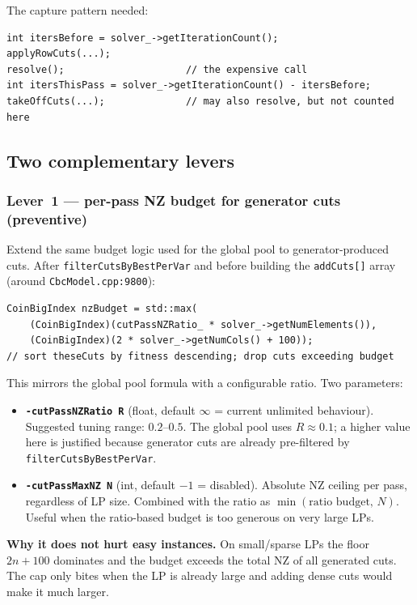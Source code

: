 \documentclass[11pt,a4paper]{article}
\begin{document}
The capture pattern needed:
\begin{lstlisting}
int itersBefore = solver_->getIterationCount();
applyRowCuts(...);
resolve();                     // the expensive call
int itersThisPass = solver_->getIterationCount() - itersBefore;
takeOffCuts(...);              // may also resolve, but not counted here
\end{lstlisting}

\subsection*{Two complementary levers}

\subsubsection*{Lever~1 --- per-pass NZ budget for generator cuts
                (preventive)}

Extend the same budget logic used for the global pool to
generator-produced cuts.  After \texttt{filterCutsByBestPerVar} and
before building the \texttt{addCuts[]} array (around
\texttt{CbcModel.cpp:9800}):

\begin{lstlisting}
CoinBigIndex nzBudget = std::max(
    (CoinBigIndex)(cutPassNZRatio_ * solver_->getNumElements()),
    (CoinBigIndex)(2 * solver_->getNumCols() + 100));
// sort theseCuts by fitness descending; drop cuts exceeding budget
\end{lstlisting}

This mirrors the global pool formula with a configurable ratio.
Two parameters:

\begin{itemize}[leftmargin=*]
  \item \textbf{\texttt{-cutPassNZRatio R}} (float, default $\infty$ =
        current unlimited behaviour).  Suggested tuning range:
        $0.2$--$0.5$.  The global pool uses $R \approx 0.1$; a higher
        value here is justified because generator cuts are already
        pre-filtered by \texttt{filterCutsByBestPerVar}.
  \item \textbf{\texttt{-cutPassMaxNZ N}} (int, default $-1$ =
        disabled).  Absolute NZ ceiling per pass, regardless of LP
        size.  Combined with the ratio as
        $\min(\text{ratio budget},\,N)$.  Useful when the ratio-based
        budget is too generous on very large LPs.
\end{itemize}

\textbf{Why it does not hurt easy instances.}  On small/sparse LPs
the floor $2n+100$ dominates and the budget exceeds the total NZ of
all generated cuts.  The cap only bites when the LP is already large
and adding dense cuts would make it much larger.
\end{document}
